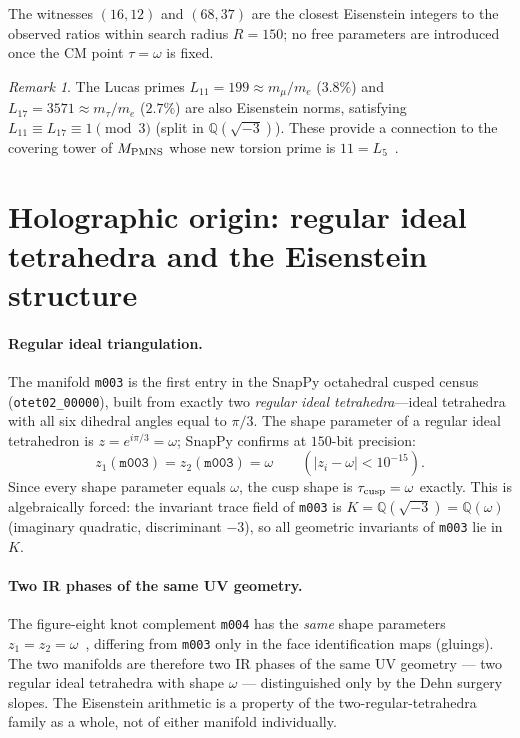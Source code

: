 \documentclass[11pt,a4paper]{article}
\theoremstyle{remark}
\newtheorem{remark}{Remark}
\newcommand{\mfld}[1]{\texttt{#1}}
\newcommand{\Q}{\mathbb{Q}}
\begin{document}
The witnesses $(16,12)$ and $(68,37)$ are the closest Eisenstein integers
to the observed ratios within search radius $R=150$; no free parameters
are introduced once the CM point $\tau=\omega$ is fixed.

\begin{remark}
The Lucas primes $L_{11}=199\approx m_\mu/m_e$ ($3.8\%$) and
$L_{17}=3571\approx m_\tau/m_e$ ($2.7\%$) are also Eisenstein norms,
satisfying $L_{11}\equiv L_{17}\equiv 1\pmod{3}$ (split in $\Q(\sqrt{-3})$).
These provide a connection to the covering tower of $M_{\rm PMNS}$
whose new torsion prime is $11=L_5$~\cite{GentryFarey}.
\end{remark}

\section{Holographic origin: regular ideal tetrahedra and the Eisenstein structure}
\label{sec:holography}

\paragraph{Regular ideal triangulation.}
The manifold \mfld{m003} is the first entry in the SnapPy octahedral
cusped census (\texttt{otet02\_00000}), built from exactly two
\emph{regular ideal tetrahedra}---ideal tetrahedra with all six dihedral
angles equal to $\pi/3$.
The shape parameter of a regular ideal tetrahedron is $z=e^{i\pi/3}=\omega$;
SnapPy confirms at $150$-bit precision:
\begin{equation}
z_1(\mfld{m003})=z_2(\mfld{m003})=\omega\qquad(|z_i-\omega|<10^{-15}).
\end{equation}
Since every shape parameter equals $\omega$, the cusp shape is
$\tau_{\rm cusp}=\omega$ exactly.
This is algebraically forced: the invariant trace field of \mfld{m003}
is $K=\Q(\sqrt{-3})=\Q(\omega)$ (imaginary quadratic, discriminant $-3$),
so all geometric invariants of \mfld{m003} lie in~$K$.

\paragraph{Two IR phases of the same UV geometry.}
The figure-eight knot complement \mfld{m004} has the \emph{same}
shape parameters $z_1=z_2=\omega$~\cite{SnapPy}, differing from \mfld{m003}
only in the face identification maps (gluings).
The two manifolds are therefore two IR phases of the same UV geometry
--- two regular ideal tetrahedra with shape $\omega$ --- distinguished
only by the Dehn surgery slopes.
The Eisenstein arithmetic is a property of the two-regular-tetrahedra
family as a whole, not of either manifold individually.
\end{document}
